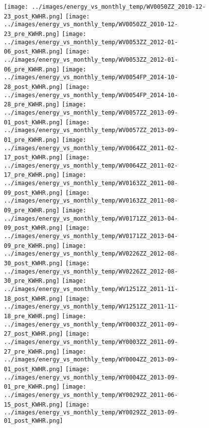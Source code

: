 \clearpage
\begin{figure}
\centering
\texttt{[image: ../images/energy\_vs\_monthly\_temp/WV0050ZZ\_2010-12-23\_post\_KWHR.png]}
\texttt{[image: ../images/energy\_vs\_monthly\_temp/WV0050ZZ\_2010-12-23\_pre\_KWHR.png]}
\texttt{[image: ../images/energy\_vs\_monthly\_temp/WV0053ZZ\_2012-01-06\_post\_KWHR.png]}
\texttt{[image: ../images/energy\_vs\_monthly\_temp/WV0053ZZ\_2012-01-06\_pre\_KWHR.png]}
\texttt{[image: ../images/energy\_vs\_monthly\_temp/WV0054FP\_2014-10-28\_post\_KWHR.png]}
\texttt{[image: ../images/energy\_vs\_monthly\_temp/WV0054FP\_2014-10-28\_pre\_KWHR.png]}
\texttt{[image: ../images/energy\_vs\_monthly\_temp/WV0057ZZ\_2013-09-01\_post\_KWHR.png]}
\texttt{[image: ../images/energy\_vs\_monthly\_temp/WV0057ZZ\_2013-09-01\_pre\_KWHR.png]}
\texttt{[image: ../images/energy\_vs\_monthly\_temp/WV0064ZZ\_2011-02-17\_post\_KWHR.png]}
\texttt{[image: ../images/energy\_vs\_monthly\_temp/WV0064ZZ\_2011-02-17\_pre\_KWHR.png]}
\texttt{[image: ../images/energy\_vs\_monthly\_temp/WV0163ZZ\_2011-08-09\_post\_KWHR.png]}
\texttt{[image: ../images/energy\_vs\_monthly\_temp/WV0163ZZ\_2011-08-09\_pre\_KWHR.png]}
\texttt{[image: ../images/energy\_vs\_monthly\_temp/WV0171ZZ\_2013-04-09\_post\_KWHR.png]}
\texttt{[image: ../images/energy\_vs\_monthly\_temp/WV0171ZZ\_2013-04-09\_pre\_KWHR.png]}
\texttt{[image: ../images/energy\_vs\_monthly\_temp/WV0226ZZ\_2012-08-30\_post\_KWHR.png]}
\texttt{[image: ../images/energy\_vs\_monthly\_temp/WV0226ZZ\_2012-08-30\_pre\_KWHR.png]}
\texttt{[image: ../images/energy\_vs\_monthly\_temp/WV1251ZZ\_2011-11-18\_post\_KWHR.png]}
\texttt{[image: ../images/energy\_vs\_monthly\_temp/WV1251ZZ\_2011-11-18\_pre\_KWHR.png]}
\texttt{[image: ../images/energy\_vs\_monthly\_temp/WY0003ZZ\_2011-09-27\_post\_KWHR.png]}
\texttt{[image: ../images/energy\_vs\_monthly\_temp/WY0003ZZ\_2011-09-27\_pre\_KWHR.png]}
\texttt{[image: ../images/energy\_vs\_monthly\_temp/WY0004ZZ\_2013-09-01\_post\_KWHR.png]}
\texttt{[image: ../images/energy\_vs\_monthly\_temp/WY0004ZZ\_2013-09-01\_pre\_KWHR.png]}
\texttt{[image: ../images/energy\_vs\_monthly\_temp/WY0029ZZ\_2011-06-15\_post\_KWHR.png]}
\texttt{[image: ../images/energy\_vs\_monthly\_temp/WY0029ZZ\_2013-09-01\_post\_KWHR.png]}
\end{figure}
